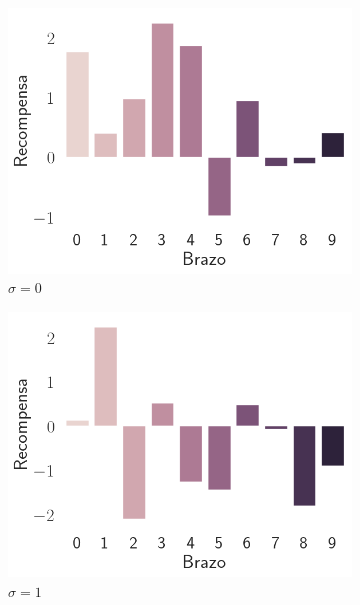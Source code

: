 \documentclass[12pt]{article}
\begin{document}
    \begin{figure}[H]
        \centering
        \begin{subfigure}[H]{0.3\textwidth}
            \includegraphics[width=\textwidth]{../img/rewards_sigma_0}
            \caption{$\sigma=0$}
            \label{fig:rewards_0}
        \end{subfigure}
        \begin{subfigure}[H]{0.3\textwidth}
            \includegraphics[width=\textwidth]{../img/rewards_sigma_1}
            \caption{$\sigma=1$}
            \label{fig:rewards_1}
        \end{subfigure}
        \begin{subfigure}[H]{0.3\textwidth}

\end{subfigure}
\end{figure}
\end{document}
